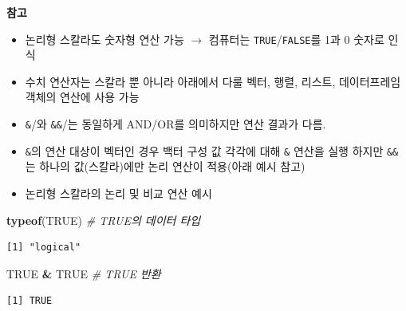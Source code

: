 \documentclass[
  11pt,
]{krantz}
\makeatletter
\newenvironment{Shaded}{\begin{snugshade}}{\end{snugshade}}
\newcommand{\CommentTok}[1]{\textcolor[rgb]{0.37,0.37,0.37}{\textit{#1}}}
\newcommand{\KeywordTok}[1]{\textcolor[rgb]{0.27,0.27,0.27}{\textbf{#1}}}
\newcommand{\NormalTok}[1]{#1}
\newcommand{\OperatorTok}[1]{\textcolor[rgb]{0.43,0.43,0.43}{\textbf{#1}}}
\newcommand{\OtherTok}[1]{\textcolor[rgb]{0.37,0.37,0.37}{#1}}
\newcommand{\StringTok}[1]{\textcolor[rgb]{0.5,0.5,0.5}{#1}}
\providecommand{\tightlist}{%
  \setlength{\itemsep}{0pt}\setlength{\parskip}{0pt}}
\newenvironment{kframe}{%
\medskip{}
\setlength{\fboxsep}{.8em}
 \def\at@end@of@kframe{}%
 \ifinner\ifhmode%
  \def\at@end@of@kframe{\end{minipage}}%
  \begin{minipage}{\columnwidth}%
 \fi\fi%
 \def\FrameCommand##1{\hskip\@totalleftmargin \hskip-\fboxsep
 \colorbox{shadecolor}{##1}\hskip-\fboxsep
     \hskip-\linewidth \hskip-\@totalleftmargin \hskip\columnwidth}%
 \MakeFramed {\advance\hsize-\width
   \@totalleftmargin\z@ \linewidth\hsize
   \@setminipage}}%
 {\par\unskip\endMakeFramed%
 \at@end@of@kframe}
\newenvironment{rmdblock}[1]
  {
  \begin{itemize}
  \renewcommand{\labelitemi}{
    \raisebox{-.7\height}[0pt][0pt]{
      {\setkeys{Gin}{width=3em,keepaspectratio}\texttt{[image: images/\#1]}}
    }
  }
  \setlength{\fboxsep}{1em}
  \begin{kframe}
  \item
  }
  {
  \end{kframe}
  \end{itemize}
  }
\newenvironment{rmdnote}
  {\begin{rmdblock}{note}}
  {\end{rmdblock}}
\makeatother
\begin{document}
\normalsize

\footnotesize

\begin{rmdnote}
\begin{rmdnote}

\textbf{참고}

\begin{itemize}
\tightlist
\item
  논리형 스칼라도 숫자형 연산 가능 \(\rightarrow\) 컴퓨터는 \texttt{TRUE}/\texttt{FALSE}를 1과 0 숫자로 인식
\item
  수치 연산자는 스칼라 뿐 아니라 아래에서 다룰 벡터, 행렬, 리스트, 데이터프레임 객체의 연산에 사용 가능
\item
  \texttt{\&}/\texttt{\textbar{}}와 \texttt{\&\&}/\texttt{\textbar{}\textbar{}}는 동일하게 AND/OR를 의미하지만 연산 결과가 다름.
\item
  \texttt{\&}의 연산 대상이 벡터인 경우 백터 구성 값 각각에 대해 \texttt{\&} 연산을 실행 하지만 \texttt{\&\&}는 하나의 값(스칼라)에만 논리 연산이 적용(아래 예시 참고)
\end{itemize}

\end{rmdnote}
\end{rmdnote}

\normalsize

\begin{itemize}
\tightlist
\item
  논리형 스칼라의 논리 및 비교 연산 예시
\end{itemize}

\footnotesize

\begin{Shaded}
\begin{Highlighting}[]
\KeywordTok{typeof}\NormalTok{(}\OtherTok{TRUE}\NormalTok{)  }\CommentTok{# TRUE의 데이터 타입}
\end{Highlighting}
\end{Shaded}

\begin{verbatim}
[1] "logical"
\end{verbatim}

\begin{Shaded}
\begin{Highlighting}[]
\OtherTok{TRUE} \OperatorTok{&}\StringTok{ }\OtherTok{TRUE}  \CommentTok{# TRUE 반환}
\end{Highlighting}
\end{Shaded}

\begin{verbatim}
[1] TRUE
\end{verbatim}
\end{document}
